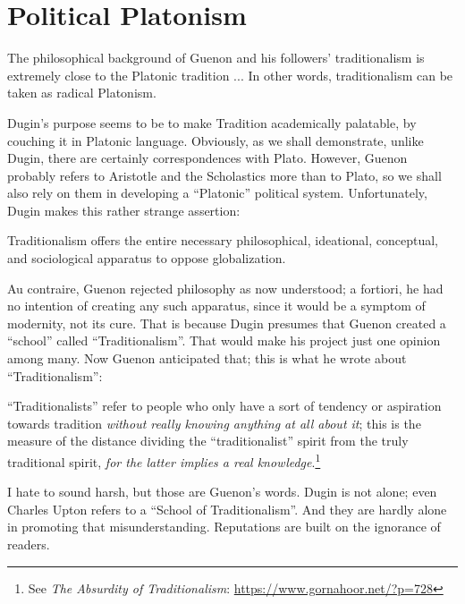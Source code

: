 \section{Political Platonism}

\begin{quotex}
The philosophical background of Guenon and his followers' traditionalism is extremely close to the Platonic tradition ... In other words, traditionalism can be taken as radical Platonism.
\end{quotex}


Dugin's purpose seems to be to make Tradition academically palatable, by couching it in Platonic language. Obviously, as we shall demonstrate, unlike Dugin, there are certainly correspondences with Plato. However, Guenon probably refers to Aristotle and the Scholastics more than to Plato, so we shall also rely on them in developing a ``Platonic'' political system. Unfortunately, Dugin makes this rather strange assertion:

\begin{quotex}
Traditionalism offers the entire necessary philosophical, ideational, conceptual, and sociological apparatus to oppose globalization.
\end{quotex}


Au contraire, Guenon rejected philosophy as now understood; a fortiori, he had no intention of creating any such apparatus, since it would be a symptom of modernity, not its cure. That is because Dugin presumes that Guenon created a ``school'' called ``Traditionalism''. That would make his project just one opinion among many. Now Guenon anticipated that; this is what he wrote about ``Traditionalism'':

\begin{quotex} 
``Traditionalists'' refer to people who only have a sort of tendency or aspiration towards tradition \emph{without really knowing anything at all about it}; this is the measure of the distance dividing the ``traditionalist'' spirit from the truly traditional spirit, \emph{for the latter implies a real knowledge}.\footnote{See \textit{The Absurdity of Traditionalism}: \url{https://www.gornahoor.net/?p=728}}
\end{quotex}


I hate to sound harsh, but those are Guenon's words. Dugin is not alone; even Charles Upton refers to a ``School of Traditionalism''. And they are hardly alone in promoting that misunderstanding. Reputations are built on the ignorance of readers.

